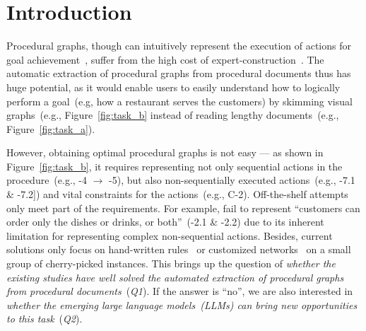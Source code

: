 

\section{Introduction
}

\label{sec:intro}
Procedural graphs, though can intuitively represent the execution of actions for goal achievement~\cite{momouchi1980control, ren2023constructing}, suffer from the high cost of expert-construction~\cite{herbst1999inductive, maqbool2019comprehensive}.
The automatic extraction of procedural graphs from procedural documents thus has huge potential, as it would enable users to easily understand how to logically perform a goal~(e.g, how a restaurant serves the customers) by skimming visual graphs~(e.g., Figure~\ref{fig:task_b} instead of reading lengthy documents~(e.g., Figure~\ref{fig:task_a}).

However, obtaining optimal procedural graphs is not easy --- as shown in Figure~\ref{fig:task_b}, it requires representing not only sequential actions in the procedure~(e.g., \uppercase\expandafter{}-4  $\rightarrow$ \uppercase\expandafter{}-5), but also non-sequentially executed actions~(e.g., \uppercase\expandafter{}-7.1 \& \uppercase\expandafter{}-7.2]) and vital constraints for the actions~(e.g., C-2).
Off-the-shelf attempts only meet part of the requirements. For example, \citet{bellan2023pet, ren2023constructing} fail to represent ``customers can order only the dishes or drinks, or both''~(\uppercase\expandafter{}-2.1 \& \uppercase\expandafter{}-2.2) due to its inherent limitation for representing complex non-sequential actions.
Besides, current solutions only focus on hand-written rules~\cite{sholiq2022generating} or customized networks~\cite{bellan2023pet} on a small group of cherry-picked instances. This brings up the question of \textit{whether the existing studies have well solved the automated extraction of procedural graphs from procedural documents}~(\textit{Q1}). If the answer is ``no'', we are also interested in \textit{whether the emerging large language models~(LLMs) can bring new opportunities to this task}~(\textit{Q2}).

